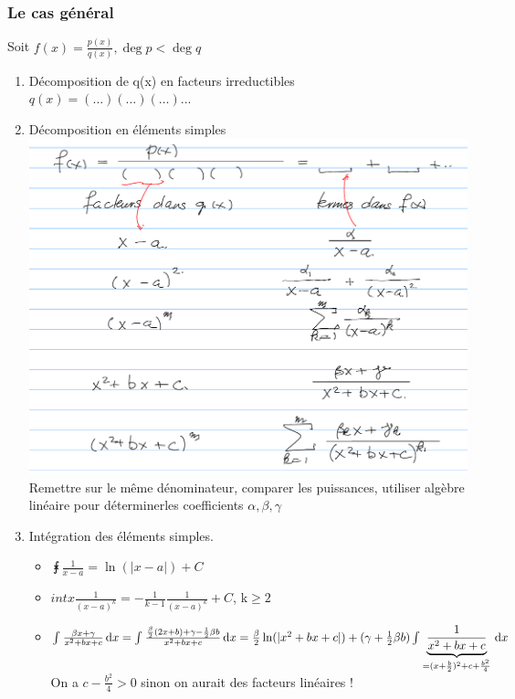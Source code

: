 \documentclass[12pt,a4paper]{article}
\begin{document}
{\subsubsection{Le cas général}
Soit $f(x) = \frac{p(x)}{q(x)}, \deg p < \deg q$
\begin{enumerate}
	\item Décomposition de q(x) en facteurs irreductibles \\
	$q(x) = (\ldots)(\ldots)(\ldots)...$
	\item Décomposition en éléments simples \\
	\includegraphics[scale=0.5]{Illustrations_Analyse/elements_simples}\\
	Remettre sur le même dénominateur, comparer les puissances, utiliser algèbre linéaire pour déterminerles coefficients $\alpha,\beta,\gamma$
	\item Intégration des éléments simples.
	\begin{itemize}
		\item $\intx{}{}{\frac{1}{x-a}} = \ln(|x-a|) + C$
		\item $intx{}{}{\frac{1}{(x-a)^k}} = -\frac{1}{k-1}\frac{1}{(x-a)^k} + C$, k$\geq 2$
		\item $\int_{}^{} \frac{\beta x + \gamma}{x^2+bx+c} \, \mathrm d x = \int_{}^{} \frac{\frac{\beta}{2}(2x+b)+\gamma - \frac{1}{2}\beta b}{x^2+bx +c} \, \mathrm d x \\
		= \frac{\beta}{2} \ln(|x^2+bx+c|) + (\gamma+ \frac{1}{2}\beta b)\int_{}^{} \underbrace{\frac{1}{x^2+bx+c}}_{=(x+\frac{b}{2})^2+c+\frac{b^2}{4}} \, \mathrm d x$\\
		On a $c - \frac{b^2}{4} > 0$ sinon on aurait des facteurs linéaires !\\

\end{itemize}
\end{enumerate}}
\end{document}
